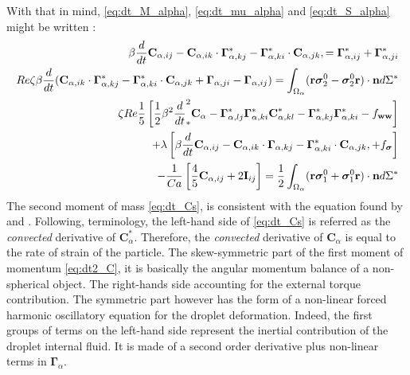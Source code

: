 With that in mind, \ref{eq:dt_M_alpha}, \ref{eq:dt_mu_alpha} and \ref{eq:dt_S_alpha} might be written :
\begin{align}
    \label{eq:dt_Cs}
    \beta \frac{d}{d t} \textbf{C}_{\alpha,ij}
    - \textbf{C}_{\alpha,ik} \cdot \bm\Gamma_{\alpha,kj}^*
    - \bm\Gamma_{\alpha,ki}^* \cdot \textbf{C}_{\alpha,jk},
    = 
    \bm\Gamma_{\alpha,ij}^*
    +  \bm\Gamma_{\alpha,ji}^*\\
    Re \zeta \beta \frac{d}{d t}( \textbf{C}_{\alpha,ik} \cdot \bm\Gamma_{\alpha,kj}^*
    -  \bm\Gamma_{\alpha,ki}^* \cdot \textbf{C}_{\alpha,jk}
    + \bm\Gamma_{\alpha,ji} - \bm\Gamma_{\alpha,ij})
    =  \int_{\Omega_\alpha} (\textbf{r}\bm\sigma_2^0- \bm\sigma_2^0\textbf{r})\cdot \textbf{n} d\Sigma^*\\
    \zeta Re \frac{1}{5}  
    \left[
        \frac{1}{2}\beta^2 \frac{d}{d t}^2_* \textbf{C}_\alpha
        - \bm\Gamma_{\alpha,lj}^* \bm\Gamma_{\alpha,ki}^* \textbf{C}_{\alpha,kl}^* 
        - \bm\Gamma_{\alpha,kj}^* \bm\Gamma_{\alpha,ki}^* 
        - f_\textbf{ww}
    \right]\nonumber\\
    + \lambda \left[
        \beta \frac{d}{d t} \textbf{C}_{\alpha,ij}
        -\textbf{C}_{\alpha,ik} \cdot \bm\Gamma_{\alpha,kj}
        - \bm\Gamma_{\alpha,ki}^* \cdot \textbf{C}_{\alpha,jk},
        + f_{\bm{\sigma}}
    \right]\nonumber\\
    - \frac{1}{Ca}\left[
        \frac{4}{5} \textbf{C}_{\alpha,ij}
        +2 \textbf{I}_{ij} 
    \right]
    =
    \frac{1}{2}\int_{\Omega_\alpha} (\textbf{r}\bm\sigma_1^0+ \bm\sigma_1^0\textbf{r})\cdot \textbf{n} d\Sigma^*
    \label{eq:dt2_C}
\end{align}
The second moment of mass \ref{eq:dt_Cs}, is consistent with the equation found by \citet{goddard1967nonlinear} and \citet{lhuillier1987phenomenology}. 
Following, \citet{goddard1967nonlinear}  terminology, the left-hand side of \ref{eq:dt_Cs} is referred as the \textit{convected} derivative of $\textbf{C}^*_\alpha$. 
Therefore, the \textit{convected} derivative of $\textbf{C}_\alpha$ is equal to the rate of strain of the particle. 
The skew-symmetric part of the first moment of momentum \ref{eq:dt2_C}, it is basically the angular momentum balance of a non-spherical object. 
The right-hands side accounting for the external torque contribution. 
The symmetric part however has the form of a non-linear forced harmonic oscillatory equation for the droplet deformation. 
Indeed, the first groups of terms on the left-hand side represent the inertial contribution of the droplet internal fluid. 
It is made of a second order derivative plus non-linear terms in $\bm\Gamma_\alpha$. 
